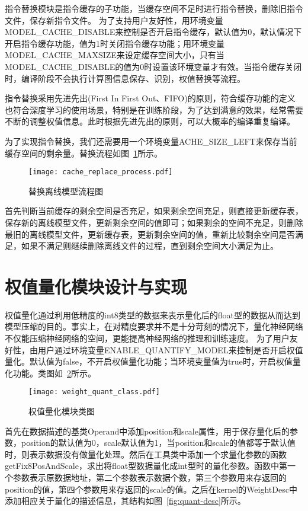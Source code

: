 指令替换模块是指令缓存的子功能，当缓存空间不足时进行指令替换，删除旧指令文件，保存新指令文件。
为了支持用户友好性，用环境变量MODEL\_CACHE\_DISABLE来控制是否开启指令缓存，默认值为0，默认情况下开启指令缓存功能，值为1时关闭指令缓存功能；用环境变量MODEL\_CACHE\_MAXSIZE来设定缓存空间大小，只有当MODEL\_CACHE\_DISABLE的值为0时设置该环境变量才有效。当指令缓存关闭时，编译阶段不会执行计算图信息保存、识别，权值替换等流程。

指令替换采用先进先出(First In First Out、FIFO)的原则，符合缓存功能的定义也符合深度学习的使用场景，特别是在训练阶段，为了达到满意的效果，经常需要不断的调整权值信息。此时根据先进先出的原则，可以大概率的编译重复编译。

为了实现指令替换，我们还需要用一个环境变量ACHE\_SIZE\_LEFT来保存当前缓存空间的剩余量。替换流程如图~\ref{fig:cache-replace-process}所示。

\begin{figure}[htb]
  \centering
  \texttt{[image: cache\_replace\_process.pdf]}
  \caption{替换离线模型流程图}
  \label{fig:cache-replace-process}
\end{figure}

首先判断当前缓存的剩余空间是否充足，如果剩余空间充足，则直接更新缓存表，保存新的离线模型文件，更新剩余空间的值即可；如果剩余的空间不充足，则删除最旧的离线模型文件，更新缓存表，更新剩余空间的值，重新比较剩余空间是否满足，如果不满足则继续删除离线文件的过程，直到剩余空间大小满足为止。

\section {权值量化模块设计与实现}
权值量化通过利用低精度的int8类型的数据来表示量化后的float型的数据从而达到模型压缩的目的。事实上，在对精度要求并不是十分苛刻的情况下，量化神经网络不仅能压缩神经网络的空间，更能提高神经网络的推理和训练速度。
为了用户友好性，由用户通过环境变量ENABLE\_QUANTIFY\_MODEL来控制是否开启权值量化。默认值为false，不开启权值量化功能；当环境变量值为true时，开启权值量化功能。类图如~\ref{fig:weight-quant-class}所示。

\begin{figure}[htb]
  \centering
  \texttt{[image: weight\_quant\_class.pdf]}
  \caption{权值量化模块类图}
  \label{fig:weight-quant-class}
\end{figure}

首先在数据描述的基类Operand中添加position和scale属性，用于保存量化后的参数，position的默认值为0，scale默认值为1，当position和scale的值都等于默认值时，则表示数据没有做量化处理。然后在工具类中添加一个求量化参数的函数getFix8PosAndScale，求出将float型数据量化成int型时的量化参数。函数中第一个参数表示原数据地址，第二个参数表示数据个数，第三个参数用来存返回的position的值，第四个参数用来存返回的scale的值。之后在kernel的WeightDesc中添加相应关于量化的描述信息，其结构如图~\ref{fig:quant-desc}所示。

